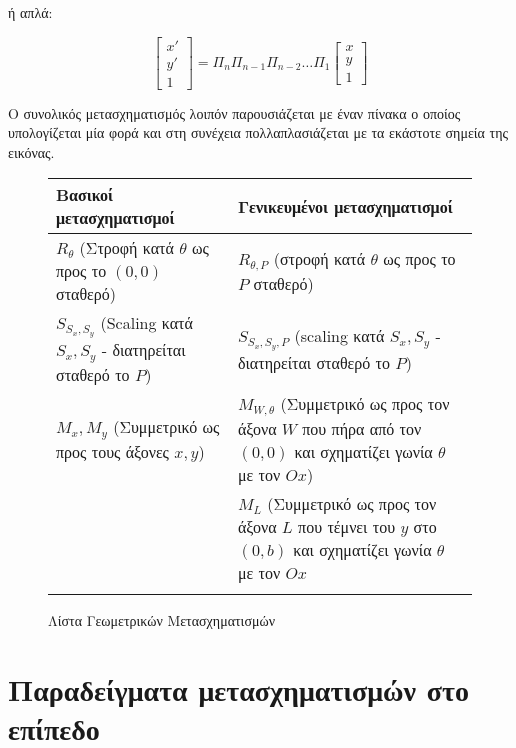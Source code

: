 ή απλά:

\[
\begin{bmatrix}
x' \\ y' \\ 1
\end{bmatrix}
=
\Pi_n \Pi_{n-1} \Pi_{n-2} \ldots \Pi_1
\begin{bmatrix}
x \\ y \\ 1
\end{bmatrix}
\]

Ο συνολικός μετασχηματισμός λοιπόν παρουσιάζεται με έναν πίνακα ο οποίος υπολογίζεται μία φορά και στη συνέχεια πολλαπλασιάζεται με τα εκάστοτε σημεία της εικόνας.

\begin{figure}
	\begin{center}
	\begin{tabular}{m{}m{}}
	\toprule
	\textbf{Βασικοί μετασχηματισμοί} & \textbf{Γενικευμένοι μετασχηματισμοί} \\
	\midrule
	$R_\theta$ (Στροφή κατά $\theta$ ως προς το $(0,0)$ σταθερό) &  $R_{\theta, P}$ (στροφή κατά $\theta$ ως προς το $P$ σταθερό)\\
	$S_{S_x, S_y}$ (Scaling κατά $S_x, S_y$ - διατηρείται σταθερό το $P$) & $S_{S_x, S_y,P}$ (scaling κατά $S_x, S_y$ - διατηρείται σταθερό το $P$)	 \\
	$M_x, M_y$ (Συμμετρικό ως προς τους άξονες $x,y$) & $M_{W, \theta}$ (Συμμετρικό ως προς τον άξονα $W$ που πήρα από τον $(0, 0)$ και σχηματίζει γωνία $\theta$ με τον $Ox$)\\
	& $M_{L}$ (Συμμετρικό ως προς τον άξονα $L$ που τέμνει του $y$ στο $(0, b)$ και σχηματίζει γωνία $\theta$ με τον $Ox$ \\
	 \\
	\bottomrule
	\end{tabular}
	\end{center}
	\caption{Λίστα Γεωμετρικών Μετασχηματισμών}
\end{figure}

\section{Παραδείγματα μετασχηματισμών στο επίπεδο}











